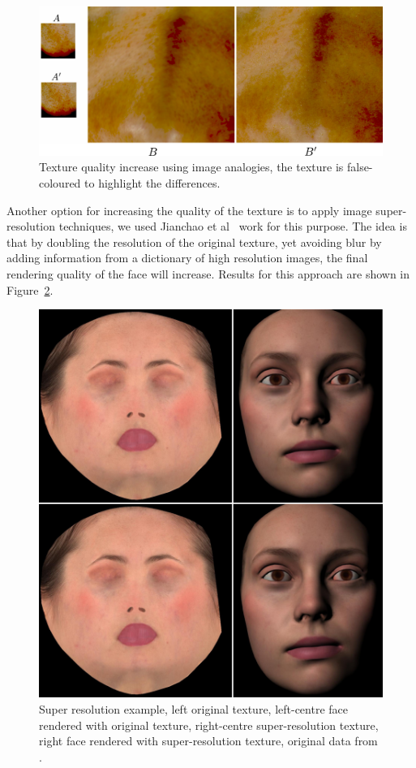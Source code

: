 \begin{figure}[htbp!]
\centering
\includegraphics[width=\textwidth]{img/texture_synthesis}
	\caption{ Texture quality increase using image analogies, the texture is false-coloured to highlight the differences.}
	\label{fig:texture_synthesis}
\end{figure}

Another option for increasing the quality of the texture is to apply image super-resolution techniques, we used Jianchao et al~\cite{Jianchao2010} work for this purpose.
The idea is that by doubling the resolution of the original texture, yet avoiding blur by adding information from a dictionary of high resolution images, the final rendering quality of the face will increase.
Results for this approach are shown in Figure~\ref{fig:emily_super_resolution}.

\begin{figure}[htbp!]
\centering
\includegraphics[width=\textwidth]{img/emily_super_resolution}
	\caption{ Super resolution example, left original texture, left-centre face rendered with original texture, right-centre super-resolution texture, right face rendered with super-resolution texture, original data from \cite{FaceWareWeb}.}
	\label{fig:emily_super_resolution}
\end{figure}

